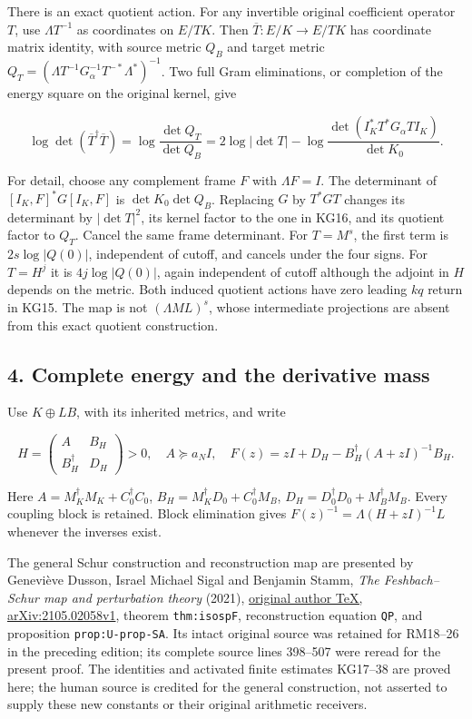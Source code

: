 \documentclass[11pt]{article}
\begin{document}
There is an exact quotient action. For any invertible original coefficient operator \(T\), use \(\Lambda T^{-1}\) as coordinates on \(E/TK\). Then \(\overline T:E/K\to E/TK\) has coordinate matrix identity, with source metric \(Q_B\) and target metric \(Q_T=(\Lambda T^{-1}G_\alpha^{-1}T^{-*}\Lambda^*)^{-1}\). Two full Gram eliminations, or completion of the energy square on the original kernel, give

\[
\boxed{\log\det(\overline T^\dagger\overline T)
=\log\frac{\det Q_T}{\det Q_B}
=2\log|\det T|-\log\frac{\det(I_K^*T^*G_\alpha TI_K)}{\det K_0}.}
\tag{KG16}
\]

For detail, choose any complement frame \(F\) with \(\Lambda F=I\). The determinant of \([I_K,F]^*G[I_K,F]\) is \(\det K_0\det Q_B\). Replacing \(G\) by \(T^*GT\) changes its determinant by \(|\det T|^2\), its kernel factor to the one in KG16, and its quotient factor to \(Q_T\). Cancel the same frame determinant. For \(T=M^s\), the first term is \(2s\log|Q(0)|\), independent of cutoff, and cancels under the four signs. For \(T=H^j\) it is \(4j\log|Q(0)|\), again independent of cutoff although the adjoint in \(H\) depends on the metric. Both induced quotient actions have zero leading \(kq\) return in KG15. The map is not \((\Lambda ML)^s\), whose intermediate projections are absent from this exact quotient construction.

\subsection{4. Complete energy and the derivative mass}\label{complete-energy-and-the-derivative-mass}

Use \(K\oplus LB\), with its inherited metrics, and write

\[
H=\begin{pmatrix}A&B_H\\B_H^\dagger&D_H\end{pmatrix}>0,
\quad A\succeq a_NI,
\quad F(z)=zI+D_H-B_H^\dagger(A+zI)^{-1}B_H.
\tag{KG17}
\]

Here \(A=M_K^\dagger M_K+C_0^\dagger C_0\), \(B_H=M_K^\dagger D_0+C_0^\dagger M_B\), \(D_H=D_0^\dagger D_0+M_B^\dagger M_B\). Every coupling block is retained. Block elimination gives \(F(z)^{-1}=\Lambda(H+zI)^{-1}L\) whenever the inverses exist.

The general Schur construction and reconstruction map are presented by Geneviève Dusson, Israel Michael Sigal and Benjamin Stamm, \emph{The Feshbach--Schur map and perturbation theory} (2021), \href{https://arxiv.org/src/2105.02058v1}{original author TeX, arXiv:2105.02058v1}, theorem \texttt{thm:isospF}, reconstruction equation \texttt{QP}, and proposition \texttt{prop:U-prop-SA}. Its intact original source was retained for RM18--26 in the preceding edition; its complete source lines 398--507 were reread for the present proof. The identities and activated finite estimates KG17--38 are proved here; the human source is credited for the general construction, not asserted to supply these new constants or their original arithmetic receivers.
\end{document}

